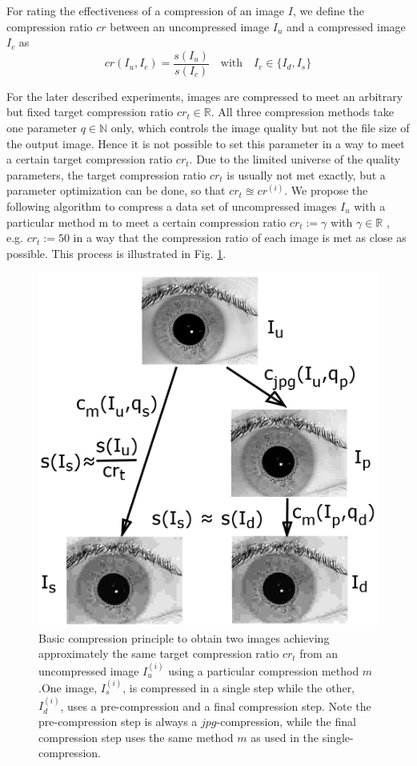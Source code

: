 \documentclass[10pt,twocolumn,letterpaper]{article}
\begin{document}
For rating the effectiveness of a compression of an image $I$, we define the compression ratio $cr$ between an uncompressed image $I_u$ and a compressed image $I_c$ as 
\begin{equation}
cr(I_u, I_c) = \frac{s(I_u)}{s(I_c)} \quad \text{with} \quad I_c \in \{I_d, I_s\}
\end{equation}

For the later described experiments, images are compressed to meet an arbitrary but fixed target compression ratio $cr_t \in \mathbb{R}$. All three compression methods take one parameter $q \in \mathbb{N}$ only, which controls the image quality but not the file size of the output image. Hence it is not possible to set this parameter in a way to meet a certain target compression ratio $cr_t$. Due to the limited universe of the quality parameters, the target compression ratio $cr_t$ is usually not met exactly, but a parameter optimization can be done, so that $cr_t \approxeq cr^{(i)}$. We propose the following algorithm to compress a data set of uncompressed images $I_u$ with a particular method m to meet a certain compression ratio $cr_t := \gamma$ with $\gamma \in \mathbb{R}$ , e.g. $cr_t := 50$ in a way that the compression ratio of each image is met as close as possible. This process is illustrated in Fig. \ref{fig:comprScheme}.

\begin{figure}[h]
	\begin{center}
		
	\includegraphics[width=0.7\linewidth]{img/comprScheme}
\end{center}
	\caption{Basic compression principle to obtain two images achieving approximately the same target compression ratio $cr_t$ from an uncompressed image $I_u^{(i)}$ using a particular compression method $m$.One image, $I_s^{(i)}$, is compressed in a single step while the other, $I_d^{(i)}$, uses a pre-compression and a final compression step. Note the pre-compression step is always a $jpg$-compression, while the final compression step uses the same method $m$ as used in the single-compression.}
	\label{fig:comprScheme}
	
\end{figure}
\end{document}

